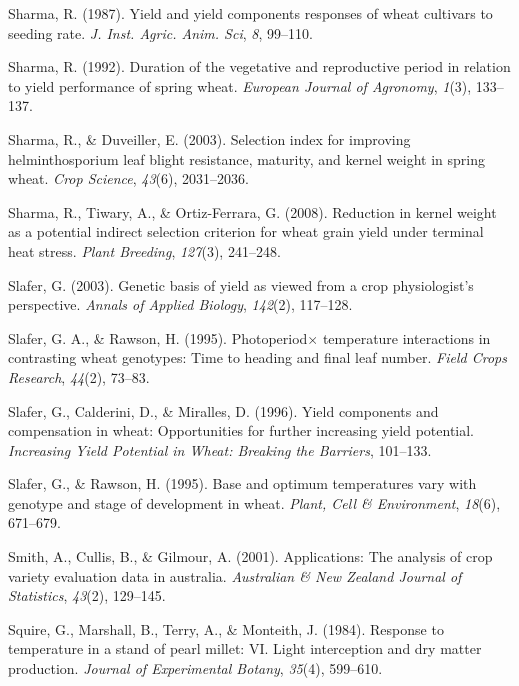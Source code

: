 \documentclass[12pt,oneside]{dukestatscithesis} %
\newlength{\cslhangindent}
\newenvironment{cslreferences}%
  {\setlength{\parindent}{0pt}%
  \everypar{\setlength{\hangindent}{\cslhangindent}}\ignorespaces}%
  {\par}
\begin{document}
\begin{cslreferences}
\leavevmode\hypertarget{ref-sharma1987yield}{}%
Sharma, R. (1987). Yield and yield components responses of wheat cultivars to seeding rate. \emph{J. Inst. Agric. Anim. Sci}, \emph{8}, 99--110.

\leavevmode\hypertarget{ref-sharma1992duration}{}%
Sharma, R. (1992). Duration of the vegetative and reproductive period in relation to yield performance of spring wheat. \emph{European Journal of Agronomy}, \emph{1}(3), 133--137.

\leavevmode\hypertarget{ref-sharma2003selection}{}%
Sharma, R., \& Duveiller, E. (2003). Selection index for improving helminthosporium leaf blight resistance, maturity, and kernel weight in spring wheat. \emph{Crop Science}, \emph{43}(6), 2031--2036.

\leavevmode\hypertarget{ref-sharma2008reduction}{}%
Sharma, R., Tiwary, A., \& Ortiz-Ferrara, G. (2008). Reduction in kernel weight as a potential indirect selection criterion for wheat grain yield under terminal heat stress. \emph{Plant Breeding}, \emph{127}(3), 241--248.

\leavevmode\hypertarget{ref-slafer2003genetic}{}%
Slafer, G. (2003). Genetic basis of yield as viewed from a crop physiologist's perspective. \emph{Annals of Applied Biology}, \emph{142}(2), 117--128.

\leavevmode\hypertarget{ref-slafer1995photoperiod}{}%
Slafer, G. A., \& Rawson, H. (1995). Photoperiod\(\times\) temperature interactions in contrasting wheat genotypes: Time to heading and final leaf number. \emph{Field Crops Research}, \emph{44}(2), 73--83.

\leavevmode\hypertarget{ref-slafer1996yield}{}%
Slafer, G., Calderini, D., \& Miralles, D. (1996). Yield components and compensation in wheat: Opportunities for further increasing yield potential. \emph{Increasing Yield Potential in Wheat: Breaking the Barriers}, 101--133.

\leavevmode\hypertarget{ref-slafer1995base}{}%
Slafer, G., \& Rawson, H. (1995). Base and optimum temperatures vary with genotype and stage of development in wheat. \emph{Plant, Cell \& Environment}, \emph{18}(6), 671--679.

\leavevmode\hypertarget{ref-smith2001applications}{}%
Smith, A., Cullis, B., \& Gilmour, A. (2001). Applications: The analysis of crop variety evaluation data in australia. \emph{Australian \& New Zealand Journal of Statistics}, \emph{43}(2), 129--145.

\leavevmode\hypertarget{ref-squire1984response}{}%
Squire, G., Marshall, B., Terry, A., \& Monteith, J. (1984). Response to temperature in a stand of pearl millet: VI. Light interception and dry matter production. \emph{Journal of Experimental Botany}, \emph{35}(4), 599--610.


\end{cslreferences}
\end{document}

